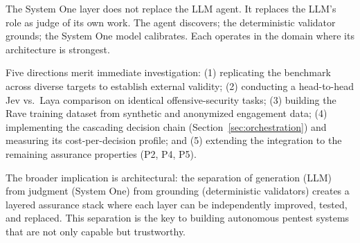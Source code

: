 \documentclass[conference]{IEEEtran}
\begin{document}
\begin{table}[h]
\centering
\caption{Summary of contributions and empirical support.}
\label{tab:summary}
\small
{}
\end{table}

The System One layer does not replace the LLM agent. It replaces the LLM's role as judge of its own work. The agent discovers; the deterministic validator grounds; the System One model calibrates. Each operates in the domain where its architecture is strongest.

Five directions merit immediate investigation: (1) replicating the benchmark across diverse targets to establish external validity; (2) conducting a head-to-head Jev vs.\ Laya comparison on identical offensive-security tasks; (3) building the Rave training dataset from synthetic and anonymized engagement data; (4) implementing the cascading decision chain (Section~\ref{sec:orchestration}) and measuring its cost-per-decision profile; and (5) extending the integration to the remaining assurance properties (P2, P4, P5).

The broader implication is architectural: the separation of generation (LLM) from judgment (System One) from grounding (deterministic validators) creates a layered assurance stack where each layer can be independently improved, tested, and replaced. This separation is the key to building autonomous pentest systems that are not only capable but trustworthy.
\end{document}
